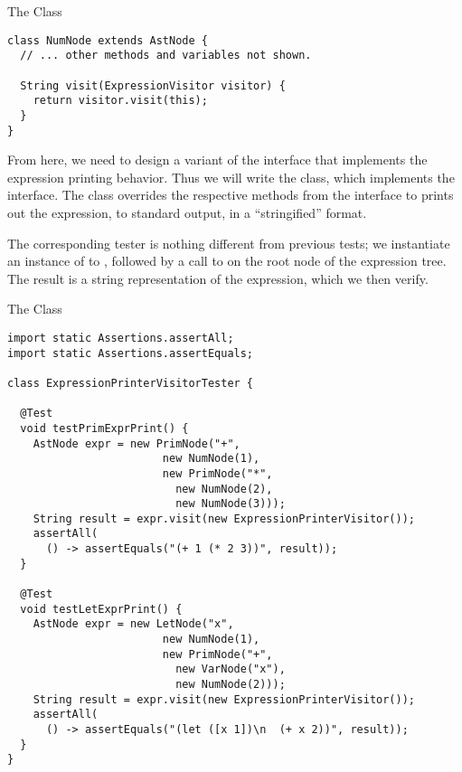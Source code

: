 \begin{cl}[]{The  Class}
\begin{lstlisting}[language=MyJava]
class NumNode extends AstNode {
  // ... other methods and variables not shown.

  String visit(ExpressionVisitor visitor) {
    return visitor.visit(this);
  }
}
\end{lstlisting}
\end{cl}

From here, we need to design a variant of the interface that implements the expression printing behavior. Thus we will write the  class, which implements the  interface. The  class overrides the respective methods from the  interface to prints out the expression, to standard output, in a ``stringified'' format.

The corresponding tester is nothing different from previous tests; we instantiate an instance of  to , followed by a call to  on the root node of the expression tree. The result is a string representation of the expression, which we then verify.

\begin{cl}[]{The  Class}
\begin{lstlisting}[language=MyJava]
import static Assertions.assertAll;
import static Assertions.assertEquals;

class ExpressionPrinterVisitorTester {

  @Test
  void testPrimExprPrint() {
    AstNode expr = new PrimNode("+", 
                        new NumNode(1), 
                        new PrimNode("*", 
                          new NumNode(2), 
                          new NumNode(3)));
    String result = expr.visit(new ExpressionPrinterVisitor());
    assertAll(
      () -> assertEquals("(+ 1 (* 2 3))", result));
  }

  @Test
  void testLetExprPrint() {
    AstNode expr = new LetNode("x", 
                        new NumNode(1), 
                        new PrimNode("+", 
                          new VarNode("x"), 
                          new NumNode(2)));
    String result = expr.visit(new ExpressionPrinterVisitor());
    assertAll(
      () -> assertEquals("(let ([x 1])\n  (+ x 2))", result));
  }
}
\end{lstlisting}
\end{cl}

